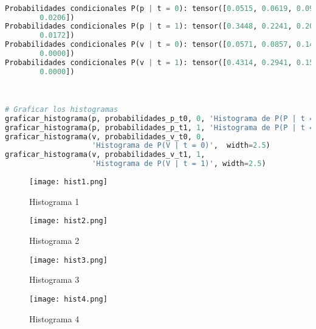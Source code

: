 \documentclass[spanish]{article}
\begin{document}
\begin{lstlisting}[language=Python, caption=Salida Probabilidades]

Probabilidades condicionales P(p | t = 0): tensor([0.0515, 0.0619, 0.0928, 0.1134, 0.1237, 0.1649, 0.1856, 0.1340, 0.0515,
        0.0206])
Probabilidades condicionales P(p | t = 1): tensor([0.3448, 0.2241, 0.2069, 0.0690, 0.0345, 0.0172, 0.0345, 0.0172, 0.0345,
        0.0172])
Probabilidades condicionales P(v | t = 0): tensor([0.0571, 0.0857, 0.1429, 0.4286, 0.1714, 0.0857, 0.0286, 0.0000, 0.0000,
        0.0000])
Probabilidades condicionales P(v | t = 1): tensor([0.4314, 0.2941, 0.1569, 0.0588, 0.0392, 0.0196, 0.0000, 0.0000, 0.0000,
        0.0000])

\end{lstlisting}
\begin{lstlisting}[language=Python, caption=Ejecucion Graficos]


# Graficar los histogramas
graficar_histograma(p, probabilidades_p_t0, 0, 'Histograma de P(P | t = 0)')
graficar_histograma(p, probabilidades_p_t1, 1, 'Histograma de P(P | t = 1)')
graficar_histograma(v, probabilidades_v_t0, 0,
                    'Histograma de P(V | t = 0)',  width=2.5)
graficar_histograma(v, probabilidades_v_t1, 1,
                    'Histograma de P(V | t = 1)', width=2.5)
\end{lstlisting}

\newpage

\begin{figure}[h]
    \centering
    \texttt{[image: hist1.png]}
    \caption{Histograma 1}
    \label{fig:enter-label}
\end{figure}

\newpage

\begin{figure}[h]
    \centering
    \texttt{[image: hist2.png]}
    \caption{Histograma 2}
    \label{fig:enter-label}
\end{figure}

\newpage


\begin{figure}[h]
    \centering
    \texttt{[image: hist3.png]}
    \caption{Histograma 3}
    \label{fig:enter-label}
\end{figure}

\newpage


\begin{figure}[h]
    \centering
    \texttt{[image: hist4.png]}
    \caption{Histograma 4}
    \label{fig:enter-label}
\end{figure}
\end{document}
